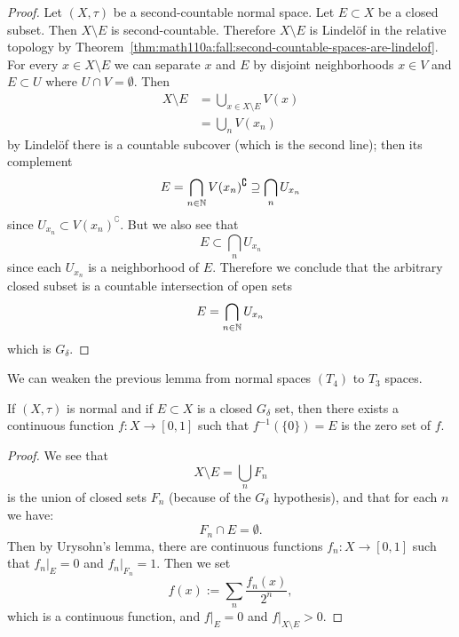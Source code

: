 \begin{proof}
Let $(X,\tau)$ be a second-countable normal space. Let $E\subset X$ be
a closed subset. Then $X\setminus E$ is second-countable. Therefore
$X\setminus E$ is Lindel\"{o}f in the relative topology by Theorem~\ref{thm:math110a:fall:second-countable-spaces-are-lindelof}.
For every $x\in X\setminus E$ we can separate $x$ and $E$ by disjoint
neighborhoods $x\in V$ and $E\subset U$ where $U\cap
V=\emptyset$. Then
\begin{subequations}
  \begin{align}
X\setminus E &= \bigcup_{x\in X\setminus E}V(x)\\
&=\bigcup_{n} V(x_{n})
  \end{align}
\end{subequations}
by Lindel\"{o}f there is a countable subcover (which is the second
line); then its complement
\begin{equation}
E = \bigcap_{n\in\mathbb{N}}V(x_{n})^{\complement}\supseteq\bigcap_{n}U_{x_{n}}
\end{equation}
since $U_{x_{n}}\subset V(x_{n})^{\complement}$. But we also see that
\begin{equation}
E\subset\bigcap_{n}U_{x_{n}}
\end{equation}
since each $U_{x_{n}}$ is a neighborhood of $E$. Therefore we conclude
that the arbitrary closed subset is a countable intersection of open sets
\begin{equation}
E=\bigcap_{n\in\mathbb{N}}U_{x_{n}}
\end{equation}
which is $G_{\delta}$.
\end{proof}

\begin{remark}
We can weaken the previous lemma from normal spaces $(T_{4})$ to
$T_{3}$ spaces.
\end{remark}

\begin{lemma}\label{lemma:fall:lec6:l3}
If $(X,\tau)$ is normal and if $E\subset X$ is a closed $G_{\delta}$
set, then there exists a continuous function $f\colon X\to[0,1]$ such
that $f^{-1}(\{0\})=E$ is the zero set of $f$.
\end{lemma}

\begin{proof}
We see that 
\begin{equation}
X\setminus E=\bigcup_{n}F_{n}
\end{equation}
is the union of closed sets $F_{n}$ (because of the $G_{\delta}$ hypothesis),
and that for each $n$ we have:
\begin{equation}
F_{n}\cap E=\emptyset.
\end{equation}
Then by Urysohn's lemma, there are continuous functions $f_{n}\colon X\to[0,1]$
such that $f_{n}|_{E}=0$ and $f_{n}|_{F_{n}}=1$. Then we set
\begin{equation}
f(x) := \sum_{n}\frac{f_{n}(x)}{2^{n}},
\end{equation}
which is a continuous function, and $f|_{E}=0$ and $f|_{X\setminus E}>0$.
\end{proof}

